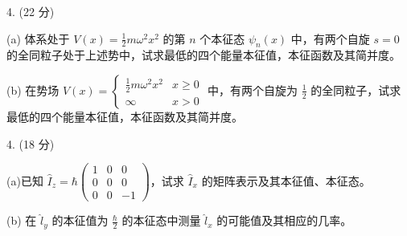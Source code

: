 4. (22 分)

(a) 体系处于 $V(x) = \frac{1}{2}m\omega^2x^2$ 的第 $n$ 个本征态 $\psi_n(x)$ 中，有两个自旋 $s = 0$ 的全同粒子处于上述势中，试求最低的四个能量本征值，本征函数及其简并度。

(b) 在势场 $V(x) = 
\begin{cases} 
\frac{1}{2}m\omega^2x^2 & x \geq 0 \\
\infty & x > 0 
\end{cases}$ 中，有两个自旋为 $\frac{1}{2}$ 的全同粒子，试求最低的四个能量本征值，本征函数及其简并度。

4. (18 分)

(a)已知 $\hat{I}_z = \hbar \begin{pmatrix}
    1 & 0 & 0 \\
    0 & 0 & 0 \\
    0 & 0 & -1
    \end{pmatrix}$，试求 $\hat{I}_x$ 的矩阵表示及其本征值、本征态。

(b) 在 $\hat{l}_y$ 的本征值为 $\frac{\hbar}{2}$ 的本征态中测量 $\hat{l}_x$ 的可能值及其相应的几率。